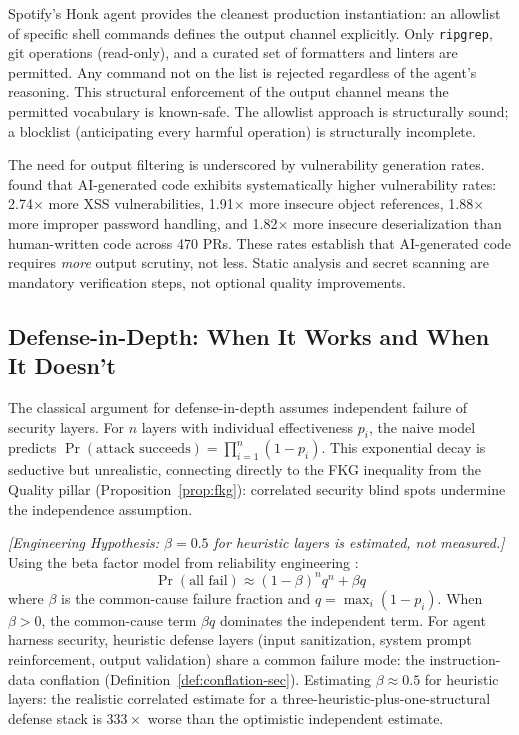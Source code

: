 Spotify's Honk agent \citep{spotify2025honk} provides the cleanest production instantiation: an allowlist of specific shell commands defines the output channel explicitly. Only \texttt{ripgrep}, git operations (read-only), and a curated set of formatters and linters are permitted. Any command not on the list is rejected regardless of the agent's reasoning. This structural enforcement of the output channel means the permitted vocabulary is known-safe. The allowlist approach is structurally sound; a blocklist (anticipating every harmful operation) is structurally incomplete.

The need for output filtering is underscored by vulnerability generation rates. \citet{coderabbit2025state} found that AI-generated code exhibits systematically higher vulnerability rates: 2.74$\times$ more XSS vulnerabilities, 1.91$\times$ more insecure object references, 1.88$\times$ more improper password handling, and 1.82$\times$ more insecure deserialization than human-written code across 470 PRs. These rates establish that AI-generated code requires \emph{more} output scrutiny, not less. Static analysis and secret scanning are mandatory verification steps, not optional quality improvements.

\subsection{Defense-in-Depth: When It Works and When It Doesn't}

The classical argument for defense-in-depth assumes independent failure of security layers. For $n$ layers with individual effectiveness $p_i$, the naive model predicts $\Pr(\text{attack succeeds}) = \prod_{i=1}^n (1 - p_i)$. This exponential decay is seductive but unrealistic, connecting directly to the FKG inequality from the Quality pillar (Proposition~\ref{prop:fkg}): correlated security blind spots undermine the independence assumption.

\begin{proposition}
\emph{[Engineering Hypothesis: $\beta = 0.5$ for heuristic layers is estimated, not measured.]}
\label{prop:correlated-defense}
Using the beta factor model from reliability engineering \citep{fleming1975beta}:
\begin{equation}
\Pr(\text{all fail}) \approx (1-\beta)^n q^n + \beta q
\end{equation}
where $\beta$ is the common-cause failure fraction and $q = \max_i(1-p_i)$. When $\beta > 0$, the common-cause term $\beta q$ dominates the independent term. For agent harness security, heuristic defense layers (input sanitization, system prompt reinforcement, output validation) share a common failure mode: the instruction-data conflation (Definition~\ref{def:conflation-sec}). Estimating $\beta \approx 0.5$ for heuristic layers: the realistic correlated estimate for a three-heuristic-plus-one-structural defense stack is $333\times$ worse than the optimistic independent estimate.
\end{proposition}

